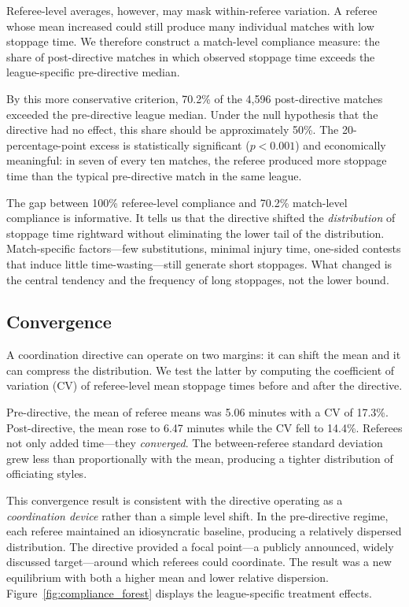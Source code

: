 \documentclass[12pt]{article}
\begin{document}
Referee-level averages, however, may mask within-referee variation. A referee whose mean increased could still produce many individual matches with low stoppage time. We therefore construct a match-level compliance measure: the share of post-directive matches in which observed stoppage time exceeds the league-specific pre-directive median.

By this more conservative criterion, 70.2\% of the 4,596 post-directive matches exceeded the pre-directive league median. Under the null hypothesis that the directive had no effect, this share should be approximately 50\%. The 20-percentage-point excess is statistically significant ($p < 0.001$) and economically meaningful: in seven of every ten matches, the referee produced more stoppage time than the typical pre-directive match in the same league.

The gap between 100\% referee-level compliance and 70.2\% match-level compliance is informative. It tells us that the directive shifted the \emph{distribution} of stoppage time rightward without eliminating the lower tail of the distribution. Match-specific factors---few substitutions, minimal injury time, one-sided contests that induce little time-wasting---still generate short stoppages. What changed is the central tendency and the frequency of long stoppages, not the lower bound.

\subsection{Convergence}
\label{subsec:convergence}

A coordination directive can operate on two margins: it can shift the mean and it can compress the distribution. We test the latter by computing the coefficient of variation (CV) of referee-level mean stoppage times before and after the directive.

Pre-directive, the mean of referee means was 5.06 minutes with a CV of 17.3\%. Post-directive, the mean rose to 6.47 minutes while the CV fell to 14.4\%. Referees not only added time---they \emph{converged}. The between-referee standard deviation grew less than proportionally with the mean, producing a tighter distribution of officiating styles.

This convergence result is consistent with the directive operating as a \emph{coordination device} rather than a simple level shift. In the pre-directive regime, each referee maintained an idiosyncratic baseline, producing a relatively dispersed distribution. The directive provided a focal point---a publicly announced, widely discussed target---around which referees could coordinate. The result was a new equilibrium with both a higher mean and lower relative dispersion. Figure~\ref{fig:compliance_forest} displays the league-specific treatment effects.
\end{document}
